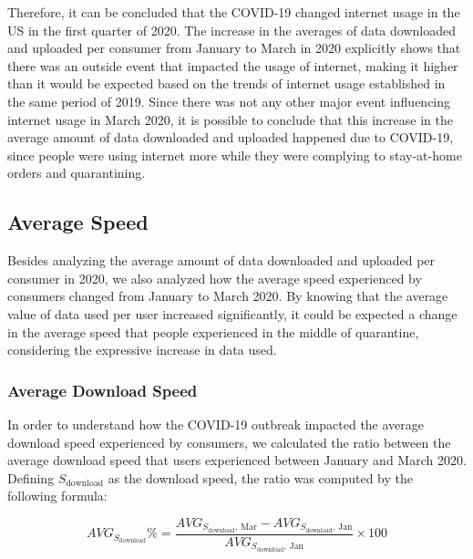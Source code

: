 \documentclass[conference,10pt]{IEEEtran}
\begin{document}
Therefore, it can be concluded that the COVID-19 changed internet usage in the US in the first quarter of 2020. The increase in the averages of data downloaded and uploaded per consumer from January to March in 2020 explicitly shows that there was an outside event that impacted the usage of internet, making it higher than it would be expected based on the trends of internet usage established in the same period of 2019. Since there was not any other major event influencing internet usage in March 2020, it is possible to conclude that this increase in the average amount of data downloaded and uploaded happened due to COVID-19, since people were using internet more while they were complying to stay-at-home orders and quarantining.

\subsection{Average Speed}
\label{sec:average-speed}
Besides analyzing the average amount of data downloaded and uploaded per consumer in 2020, we also analyzed how the average speed experienced by consumers changed from January to March 2020. By knowing that the average value of data used per user increased significantly, it could be expected a change in the average speed that people experienced in the middle of quarantine, considering the expressive increase in data used.

\subsubsection{Average Download Speed}
\label{sec:average-download-speed}

In order to understand how the COVID-19 outbreak impacted the average download speed experienced by consumers, we calculated the ratio between the average download speed that users experienced between January and March 2020. Defining $S_{\text{download}}$ as the download speed, the ratio was computed by the following formula:

\begin{equation}
AVG_{S_{\text{download}}}\% = \frac{AVG_{S_{\text{download}},\, \text{Mar}}-AVG_{S_{\text{download}},\, \text{Jan}}}{AVG_{S_{\text{download}},\, \text{Jan}}}\times 100
\end{equation}

\end{document}
